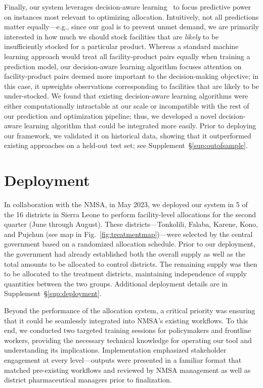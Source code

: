 \documentclass[12pt]{article}
\begin{document}
Finally, our system leverages decision-aware learning~\cite{wilder2019melding,bertsimas2020predictive,kallus2022stochastic,shahdecision} to focus predictive power on instances most relevant to optimizing allocation. Intuitively, not all predictions matter equally---e.g., since our goal is to prevent unmet demand, we are primarily interested in how much we should stock facilities that are \textit{likely} to be insufficiently stocked for a particular product. Whereas a standard machine learning approach would treat all facility-product pairs equally when training a prediction model, our decision-aware learning algorithm focuses attention on facility-product pairs deemed more important to the decision-making objective; in this case, it upweights observations corresponding to facilities that are likely to be under-stocked. We found that existing decision-aware learning algorithms were either computationally intractable at our scale or incompatible with the rest of our prediction and optimization pipeline; thus, we developed a novel decision-aware learning algorithm that could be integrated more easily. Prior to deploying our framework, we validated it on historical data, showing that it outperformed existing approaches on a held-out test set; see Supplement~\S\ref{sup:outofsample}.


\section{Deployment}

In collaboration with the NMSA,  in May 2023, we deployed our system in 5 of the 16 districts in Sierra Leone to perform facility-level allocations for the second quarter (June through August). These districts---Tonkolili, Falaba, Karene, Kono, and Pujehun (see map in Fig.~\ref{fig:treatmentmap})---were selected by the central government based on a randomized allocation schedule. Prior to our deployment, the government had already established both the overall supply as well as the total amounts to be allocated to control districts. The remaining supply was then to be allocated to the treatment districts, maintaining independence of supply quantities between the two groups. Additional deployment details are in Supplement~\S\ref{sup:deployment}.

Beyond the performance of the allocation system, a critical priority was ensuring that it could be seamlessly integrated into NMSA's existing workflows. To this end, we conducted two targeted training sessions for policymakers and frontline workers, providing the necessary technical knowledge for operating our tool and understanding its implications. Implementation emphasized stakeholder engagement at every level---outputs were presented in a familiar format that matched pre-existing workflows and reviewed by NMSA management as well as district pharmaceutical managers prior to finalization.
\end{document}
